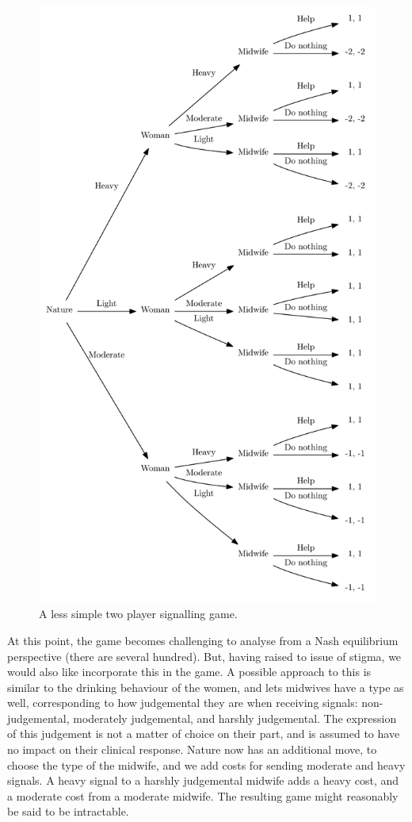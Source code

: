 \begin{figure}[H]
\includegraphics[width=\textwidth]{figures/less_simplest_game}
\caption{A less simple two player signalling game. }

\label{fig:less_simple}
\end{figure}

At this point, the game becomes challenging to analyse from a Nash equilibrium perspective (there are several hundred). But, having raised to issue of stigma, we would also like incorporate this in the game. A possible approach to this is similar to the drinking behaviour of the women, and lets midwives have a type as well, corresponding to how judgemental they are when receiving signals: non-judgemental, moderately judgemental, and harshly judgemental. The expression of this judgement is not a matter of choice on their part, and is assumed to have no impact on their clinical response. Nature now has an additional move, to choose the type of the midwife, and we add costs for sending moderate and heavy signals. A heavy signal to a harshly judgemental midwife adds a heavy cost, and a moderate cost from a moderate midwife. The resulting game might reasonably be said to be intractable.

